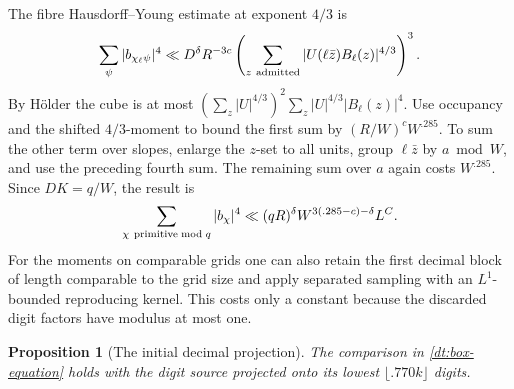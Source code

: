 \documentclass[11pt,a4paper]{article}
\theoremstyle{paperplain}
\newtheorem{proposition}[theorem]{Proposition}
\numberwithin{equation}{section}
\begin{document}
The fibre Hausdorff--Young estimate at exponent \(4/3\) is
\[
 \sum_\psi|b_{\chi_\ell\psi}|^4\ll
 D^\delta R^{-3c}
 \left(\sum_{z\ {\rm admitted}}|U(\ell\bar z)B_\ell(z)|^{4/3}\right)^3 .
\]
By Hölder the cube is at most
\((\sum_z |U|^{4/3})^2 \sum_z |U|^{4/3}|B_\ell(z)|^4\).
Use occupancy and the shifted \(4/3\)-moment to bound the first sum
by \((R/W)^c W^{.285}\). To sum the other term over slopes, enlarge
the \(z\)-set to all units, group \(\ell\bar z\) by \(a\bmod W\), and
use the preceding fourth sum. The remaining sum over \(a\) again
costs \(W^{.285}\). Since \(DK=q/W\), the result is
\begin{equation}\label{dt:analytic-quartic}
 \sum_{\chi\ {\rm primitive}\bmod q}|b_\chi|^4
   \ll (qR)^\delta W^{3(.285-c)-\delta}L^C.
\end{equation}
For the moments on comparable grids one can also retain the first
decimal block of length comparable to the grid size and apply
separated sampling with an \(L^1\)-bounded reproducing kernel.
This costs only a constant because the discarded digit factors
have modulus at most one.

\begin{proposition}[The initial decimal projection]\label{dt:analytic-projection}
The comparison in \eqref{dt:box-equation} holds with the digit source
projected onto its lowest \(\lfloor .770 k\rfloor\) digits.
\end{proposition}
\end{document}
